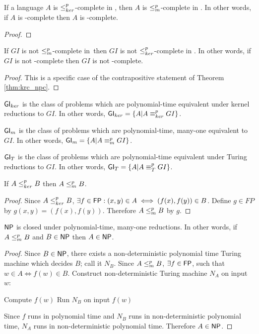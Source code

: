 \begin{theorem}\label{thm:krc_npc}If a language $A$ is $\leq^{p}_{ker}$-complete in \NPEq,
  then $A$ is $\leq^{p}_{m}$-complete in \NP. In other words, if $A$ is \NPEq-complete
  then $A$ is \NP-complete.\end{theorem}
\begin{proof}
\end{proof}

\begin{corollary}\label{cor:gi_complete}If $GI$ is not $\leq^{p}_{m}$-complete in
  \NP\,then $GI$ is not $\leq^{p}_{ker}$-complete in \NPEq. In other words, if $GI$ is not
  \NP-complete then $GI$ is not \NPEq-complete.\end{corollary}
\begin{proof}
  This is a specific case of the contrapositive statement of Theorem
  \ref{thm:krc_npc}.
\end{proof}

\begin{definition}\label{def:gi_classes}${\mathsf{GI}}_{ker}$ is the class of problems
  which are polynomial-time equivalent under kernel reductions to $GI$. In
  other words, ${\mathsf{GI}}_{ker}=\{A|A\equiv^{p}_{ker} GI\}$.

  ${\mathsf{GI}}_m$ is the class of problems which are polynomial-time, many-one
  equivalent to $GI$. In other words, ${\mathsf{GI}}_m=\{A|A\equiv^{p}_m GI\}$.

  ${\mathsf{GI}}_T$ is the class of problems which are polynomial-time equivalent under
  Turing reductions to $GI$. In other words, ${\mathsf{GI}}_T=\{A|A\equiv^{p}_T GI\}$.
\end{definition}

\begin{lemma}\label{lem:kr_mor}If $A\leq^{p}_{ker} B$ then $A\leq^{p}_{m} B$.\end{lemma}
\begin{proof}Since $A\leq^{p}_{ker} B$, $\exists f\in{\ensuremath{\mathsf{FP}}}: (x,y)\in A\iff(f(x), f(y))\in
  B$. Define $g\in FP$ by $g(x,y)=(f(x), f(y))$. Therefore $A\leq^{p}_{m} B$ by
  $g$.\end{proof}

\begin{lemma}\label{lem:np_closed}${\mathsf{NP}}$ is closed under polynomial-time,
  many-one reductions. In other words, if $A\leq^{p}_{m} B$ and $B\in{\ensuremath{\mathsf{NP}}}$ then
  $A\in{\ensuremath{\mathsf{NP}}}$.\end{lemma}
\begin{proof}
  Since $B\in{\ensuremath{\mathsf{NP}}}$, there exists a non-deterministic polynomial time Turing
  machine which decides $B$; call it $N_B$. Since $A\leq^{p}_{m} B$, $\exists f\in{\ensuremath{\mathsf{FP}}}$,
  such that $w\in A\iff f(w)\in B$. Construct non-deterministic Turing machine
  $N_A$ on input $w$:\\
  \begin{algorithm}[H]
    Compute $f(w)$\;
    Run $N_B$ on input $f(w)$\;
  \end{algorithm}
  Since $f$ runs in polynomial time and $N_B$ runs in non-deterministic
  polynomial time, $N_A$ runs in non-deterministic polynomial time. Therefore
  $A\in{\ensuremath{\mathsf{NP}}}$.
\end{proof}

